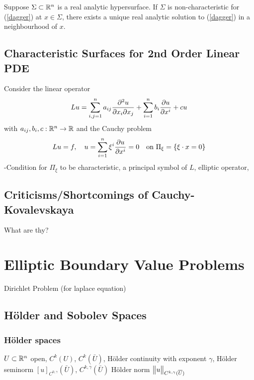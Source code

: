 \documentclass[10pt,a4paper]{report}
\begin{document}
\thm Suppose $\Sigma \subset \mathbb{R}^n$ is a real analytic hypersurface. If $\Sigma$ is non-characteristic for (\ref{dagger}) at $x\in \Sigma$, there exists a unique real analytic solution to (\ref{dagger}) in a neighbourhood of $x$.

\subsection*{Characteristic Surfaces for 2nd Order Linear PDE}

Consider the linear operator
\begin{align*}
Lu = \sum_{i,j=1}^n a_{ij}\frac{\partial^2 u}{\partial x_i \partial x_j} + \sum_{i=1}^n b_i \frac{\partial u}{\partial x^i} + cu
\end{align*}
with $a_{ij},b_i,c : \mathbb{R}^n \rightarrow \mathbb{R}$ and the Cauchy problem
\begin{align*}
Lu = f, \quad u = \sum_{i=1}^n \xi^i \frac{\partial u}{\partial x^i} = 0 \quad \text{on } \Pi_{\xi} = \{ \xi \cdot x =0 \}
\end{align*}
-Condition for $\Pi_{\xi}$ to be characteristic, a principal symbol of $L$, elliptic operator,



\subsection*{Criticisms/Shortcomings of Cauchy-Kovalevskaya}

What are thy?

\section*{Elliptic Boundary Value Problems}

Dirichlet Problem (for laplace equation)

\subsection*{H\"{o}lder and Sobolev Spaces}

\subsubsection*{H\"{o}lder spaces}

$U\subset \mathbb{R}^n$ open, $C^k(U)$, $C^k(\bar{U})$, H\"older continuity with exponent $\gamma$, H\"older seminorm $[u]_{C^{0, \gamma}}(\bar{U})$, $C^{k, \gamma}(\bar{U})$ H\"older norm $\bigl\lVert u\bigr\rVert_{C^{k, \gamma}(\overline{U})}$
\end{document}
